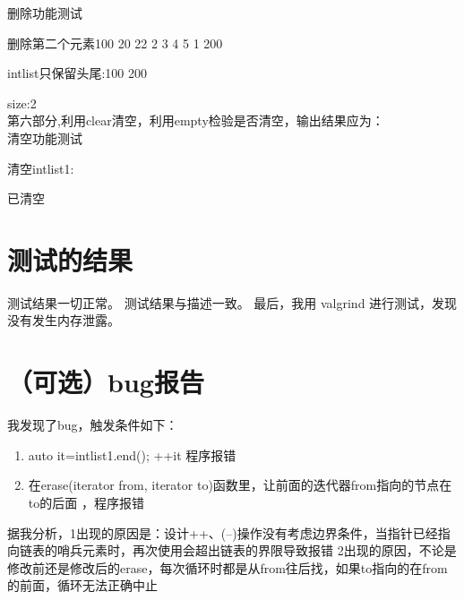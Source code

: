 \documentclass[UTF8]{ctexart}
\begin{document}
删除功能测试

删除第二个元素100 20 22 2 3 4 5 1 200

intlist只保留头尾:100 200 

size:2
\\

第六部分,利用clear清空，利用empty检验是否清空，输出结果应为：
\\

清空功能测试

清空intlist1:

已清空



\section{测试的结果}

测试结果一切正常。
测试结果与描述一致。
最后，我用 valgrind 进行测试，发现没有发生内存泄露。

\section{（可选）bug报告}

我发现了bug，触发条件如下：

\begin{enumerate}
    \item auto it=intlist1.end();
    ++it 
    程序报错
    \item 在erase(iterator from, iterator to)函数里，让前面的迭代器from指向的节点在to的后面 ，程序报错
\end{enumerate}

据我分析，1出现的原因是：设计++、(--)操作没有考虑边界条件，当指针已经指向链表的哨兵元素时，再次使用会超出链表的界限导致报错
2出现的原因，不论是修改前还是修改后的erase，每次循环时都是从from往后找，如果to指向的在from的前面，循环无法正确中止
\end{document}
